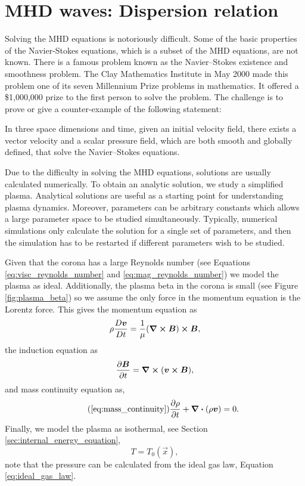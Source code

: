 \section{MHD waves: Dispersion relation}
\label{sec:mhd_waves_dispersion_relation}

Solving the MHD equations is notoriously difficult. Some of the basic properties of the Navier-Stokes equations, which is a subset of the MHD equations, are not known. There is a famous problem known as the Navier–Stokes existence and smoothness problem. The Clay Mathematics Institute in May 2000 made this problem one of its seven Millennium Prize problems in mathematics. It offered a \$1,000,000 prize to the first person to solve the problem. The challenge is to prove or give a counter-example of the following statement:
\begin{displayquote}
In three space dimensions and time, given an initial velocity field, there exists a vector velocity and a scalar pressure field, which are both smooth and globally defined, that solve the Navier–Stokes equations.
\end{displayquote}

Due to the difficulty in solving the MHD equations, solutions are usually calculated numerically. To obtain an analytic solution, we study a simplified plasma. Analytical solutions are useful as a starting point for understanding plasma dynamics. Moreover, parameters can be arbitrary constants which allows a large parameter space to be studied simultaneously. Typically, numerical simulations only calculate the solution for a single set of parameters, and then the simulation has to be restarted if different parameters wish to be studied.

Given that the corona has a large Reynolds number (see Equations \ref{eq:visc_reynolds_number} and \ref{eq:mag_reynolds_number}) we model the plasma as ideal. Additionally, the plasma beta in the corona is small (see Figure \ref{fig:plasma_beta}) so we assume the only force in the momentum equation is the Lorentz force. This gives the momentum equation as
\begin{equation}
    \label{eq:momentum_eqn_beta=0}
    \rho\frac{D \boldsymbol{v}}{D t}=\frac{1}{\mu}(\curl{\boldsymbol{B}})\cross\boldsymbol{B},
\end{equation}
the induction equation as
\begin{equation}
    \label{eq:induction_eqn_ideal}
    \pdv{\boldsymbol{B}}{t}=\curl(\boldsymbol{v}\cross\boldsymbol{B}),
\end{equation}
and mass continuity equation as,
\begin{equation}
    \tag{\ref{eq:mass_continuity}}
    \pdv{\rho}{t}+\div(\rho\vec{v})=0.
\end{equation}
Finally, we model the plasma as isothermal, see Section \ref{sec:internal_energy_equation},
\begin{equation}
    T = T_0(\vec{x}),
\end{equation}
note that the pressure can be calculated from the ideal gas law, Equation \eqref{eq:ideal_gas_law}.

